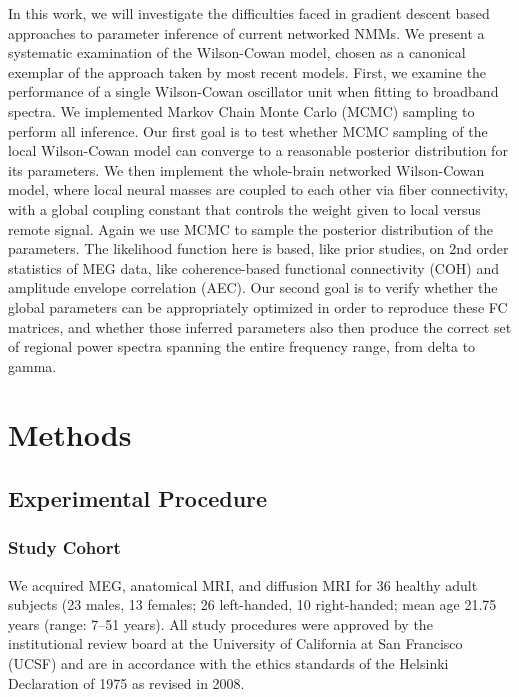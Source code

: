 In this work, we will investigate the difficulties faced in gradient descent based approaches to parameter inference of current networked NMMs. We present a systematic examination of the Wilson-Cowan model, chosen as a canonical exemplar of the approach taken by most recent models. First, we examine the performance of a single Wilson-Cowan oscillator unit when fitting to broadband spectra. We implemented Markov Chain Monte Carlo (MCMC) sampling to perform all inference. Our first goal is to test whether MCMC sampling of the local Wilson-Cowan model can converge to a reasonable posterior distribution for its parameters. We then implement the whole-brain networked Wilson-Cowan model, where local neural masses are coupled to each other via fiber connectivity, with a global coupling constant that controls the weight given to local versus remote signal.  Again we use MCMC to sample the posterior distribution of the parameters. The likelihood function here is based, like prior studies, on 2nd order statistics of MEG data, like  coherence-based functional connectivity (COH) and amplitude envelope correlation (AEC). Our second goal is to verify whether the global parameters can be appropriately optimized in order to reproduce these FC matrices, and whether those inferred parameters also then produce the correct set of regional power spectra spanning the entire frequency range, from delta to gamma.

\section{Methods}

\subsection{Experimental Procedure}

\subsubsection{Study Cohort}
We acquired MEG, anatomical MRI, and diffusion MRI for 36 healthy adult subjects (23 males, 13 females; 26 left-handed, 10 right-handed; mean age 21.75 years (range: 7–51 years). All study procedures were approved by the institutional review board at the University of California at San Francisco (UCSF) and are in accordance with the ethics standards of the Helsinki Declaration of 1975 as revised in 2008.

